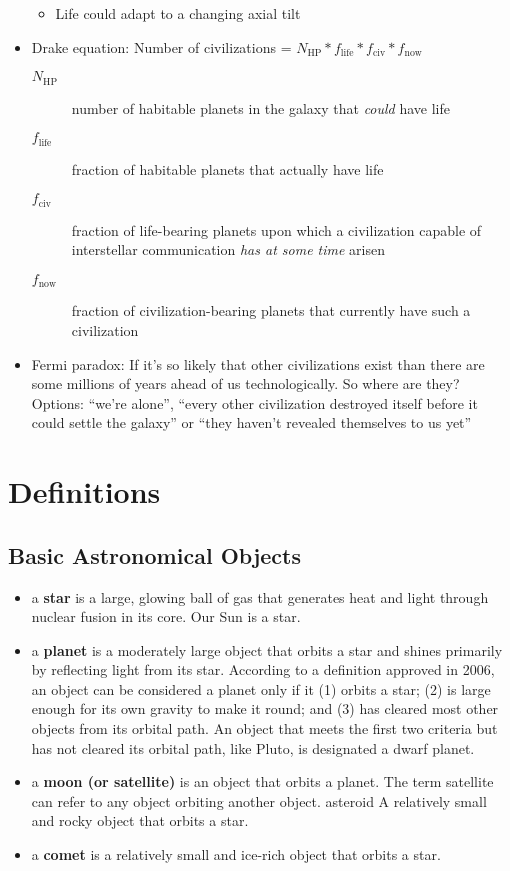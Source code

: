 \documentclass[12pt]{article}
\begin{document}
\begin{itemize}
\begin{itemize}
        \item Life could adapt to a changing axial tilt
    \end{itemize}
    \item Drake equation: Number of civilizations = $N_\text{HP} * f_\text{life} * f_\text{civ} * f_\text{now}$
    \begin{description}
        \item[$N_\text{HP}$] number of habitable planets in the galaxy that \emph{could} have life
        \item[$f_\text{life}$] fraction of habitable planets that actually have life
        \item[$f_\text{civ}$] fraction of life-bearing planets upon which a civilization capable of interstellar communication \emph{has at some time} arisen
        \item[$f_\text{now}$] fraction of civilization-bearing planets that currently have such a civilization
    \end{description}
    \item Fermi paradox: If it's so likely that other civilizations exist than there are some millions of years ahead of us technologically.  So where are they?  Options: ``we're alone'', ``every other civilization destroyed itself before it could settle the galaxy'' or ``they haven't revealed themselves to us yet''
\end{itemize}

\section{Definitions}
\subsection{Basic Astronomical Objects}
\begin{itemize}
\item a {\bf star} is a large, glowing ball of gas that generates heat and light through nuclear fusion in its core. Our Sun is a star.
\item a {\bf planet} is a moderately large object that orbits a star and shines primarily by reflecting light from its star. According to a definition
approved in 2006, an object can be considered a planet only if it (1) orbits a star; (2) is large enough for its own gravity to make
it round; and (3) has cleared most other objects from its orbital path. An object that meets the first two criteria but has not
cleared its orbital path, like Pluto, is designated a dwarf planet.
\item a {\bf moon (or satellite)} is an object that orbits a planet. The term satellite can refer to any object orbiting another object.
asteroid A relatively small and rocky object that orbits a star.
\item a {\bf comet} is a relatively small and ice-rich object that orbits a star.
\end{itemize}
\end{document}
